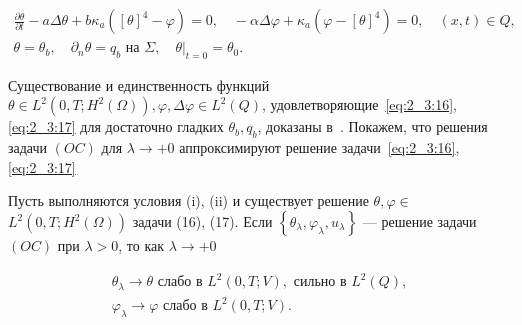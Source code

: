 \begin{align}
    \frac{\partial \theta}{\partial t}-a \Delta \theta
    + b \kappa_{a}\left([\theta]^{4}
    - \varphi\right)=0, \quad-\alpha \Delta \varphi
    + \kappa_{a}\left(\varphi-[\theta]^{4}\right) = 0,
    \quad(x, t) \in Q, \label{eq:2_3:16} \\
    \theta=\theta_{b}, \quad \partial_{n} \theta= q_{b} \text { на } \Sigma,
    \left.\quad \theta\right|_{t=0} = \theta_{0}. \label{eq:2_3:17}
\end{align}


Существование и единственность функций $\theta \in L^{2}\left(0, T; H^{2}(\Omega)\right),
\varphi, \Delta \varphi \in L^{2}( Q)$, удовлетворяющие~\eqref{eq:2_3:16},\eqref{eq:2_3:17}
для достаточно гладких $\theta_{b}, q_{b}$, доказаны в~\cite{Chebotarev2019Problem}.
Покажем, что решения задачи $(OC)$ для $\lambda \rightarrow+0$
аппроксимируют решение задачи~\eqref{eq:2_3:16},\eqref{eq:2_3:17}

\begin{theorem}
    \label{th:2_3:3}
    Пусть выполняются условия (i), (ii) и существует решение
    $\theta, \varphi \in$ $L^{2}\left(0, T ; H^{2}(\Omega) \right)$ задачи (16), (17).
    Если $\left\{\theta_{\lambda}, \varphi_{\lambda}, u_{\lambda}\right\}$
    — решение задачи $(OC)$ при $\lambda>0$, то как $\lambda\rightarrow+0$

    \[
        \begin{gathered}
            \theta_{\lambda} \rightarrow \theta \text { слабо в } L^{2}(0, T ; V),
            \text { сильно в } L^{2}(Q), \\
            \varphi_{\lambda} \rightarrow \varphi \text { слабо в } L^{2}(0, T ; V).
        \end{gathered}
    \]
\end{theorem}

